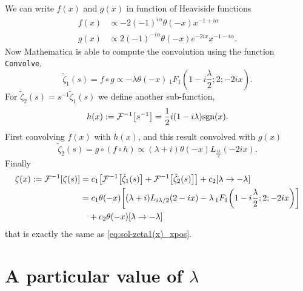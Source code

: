 \documentclass[%
 aip,
 jmp,%
 amsmath,amssymb,
 reprint,%
]{revtex4-2}
\begin{document}
We can write $f(x)$ and $g(x)$ in function of Heaviside functions
\begin{equation}
\begin{aligned}
f(x) &\propto -2(-1)^{i\alpha}\theta(-x)x^{-1+i\alpha}\\
g(x) &\propto 2(-1)^{-i\alpha}\theta(-x)e^{-2ix}x^{-1-i\alpha}.
\end{aligned}
\end{equation}
Now Mathematica is able to compute the convolution using the function \texttt{Convolve},
\begin{equation}
\tilde{\zeta}_1(s) = f\circ g \propto -\lambda \theta (-x) \, _1F_1(1-i \frac{\lambda}{2} ;2;-2 i x).
\end{equation}
For $\tilde{\zeta}_2(s) = s^{-1}\tilde{\zeta}_1(s)$ we define another sub-function,
\begin{equation*}
h(x) := \mathcal{F}^{-1}\qty[s^{-1}] = \frac{1}{2} i (1-i \lambda ) \text{sgn}(x).
\end{equation*}
First convolving $f(x)$ with $h(x)$, and this result convolved with $g(x)$
\begin{equation}
    \tilde{\zeta}_2(s) = g\circ(f\circ h) \propto (\lambda +i) \theta (-x) L_{\frac{i \lambda }{2}}(-2 i x).
\end{equation}
Finally
\begin{equation}
\begin{aligned}
\zeta(x) := \mathcal{F}^{-1}\qty[\zeta(s)] &= c_1\qty[\mathcal{F}^{-1}\qty[\tilde{\zeta}_1(s)] + \mathcal{F}^{-1}\qty[\tilde{\zeta}_2(s)]] + c_2\qty[\lambda \to -\lambda]\\
&=c_1\theta(-x)\qty[(\lambda + i)L_{i\lambda/2}(2-ix) - \lambda \,_1F_1\qty(1-i\frac{\lambda}{2};2;-2ix)]\\
&  \quad + c_2\theta(-x)\qty[\lambda \to -\lambda]
\end{aligned}
\end{equation}
that is exactly the same as \eqref{eq:sol-zeta1(x)_xpos}.

\section{A particular value of $\lambda$}
\end{document}
